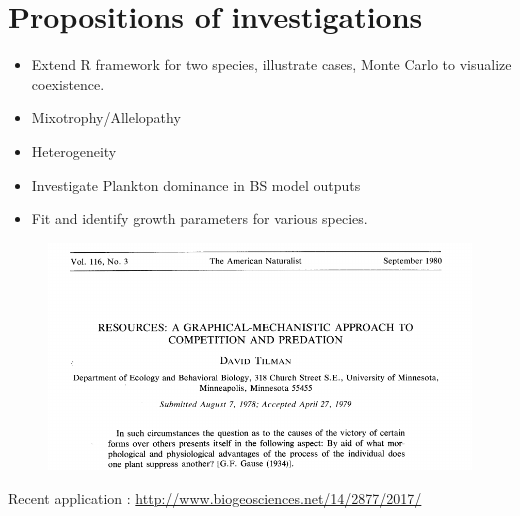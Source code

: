 \documentclass[final,xcolor=dvipsnames]{beamer}
\begin{document}
\section{Propositions of investigations}
\begin{frame}
\begin{itemize}
\item Extend R framework for two species, illustrate cases, Monte Carlo to visualize coexistence. 
\item Mixotrophy/Allelopathy
\item Heterogeneity 
\item Investigate Plankton dominance in BS model outputs
\item Fit and identify growth parameters for various species.
\end{itemize}
\end{frame}

\begin{frame}
\begin{figure}
       \includegraphics[width=.6\framewidth]{TilmanPaperCitation}
    \end{figure}
\end{frame}

\begin{frame}
Recent application : 
\url{http://www.biogeosciences.net/14/2877/2017/}
\end{frame}
\end{document}
